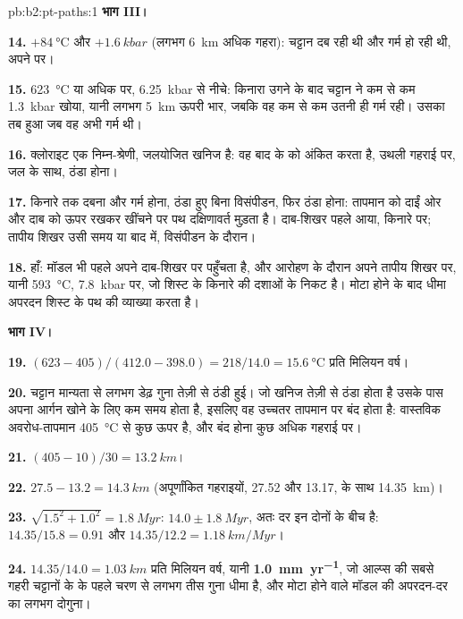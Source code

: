 \begin{solution}{pb:b2:pt-paths:1}
\noindent\textbf{भाग III।}

\textbf{14.} $+\qty{84}{\celsius}$ और $+\qty{1.6}{kbar}$ (लगभग \qty{6}{km} अधिक गहरा):
चट्टान दब रही थी और गर्म हो रही थी, अपने  पर।

\textbf{15.} \qty{623}{\celsius} या अधिक पर, \qty{6.25}{kbar} से नीचे: किनारा उगने के बाद
चट्टान ने कम से कम \qty{1.3}{kbar} खोया, यानी लगभग \qty{5}{km} ऊपरी भार, जबकि वह कम से कम
उतनी ही गर्म रही। उसका  तब हुआ जब वह अभी गर्म थी।

\textbf{16.} क्लोराइट एक निम्न-श्रेणी, जलयोजित खनिज है: वह बाद के  को अंकित करता है, उथली गहराई पर, जल के साथ, ठंडा होना।

\textbf{17.} किनारे तक दबना और गर्म होना, ठंडा हुए बिना विसंपीडन, फिर ठंडा होना:
तापमान को दाईं ओर और दाब को ऊपर रखकर खींचने पर पथ दक्षिणावर्त मुड़ता है।
दाब-शिखर पहले आया, किनारे पर; तापीय शिखर उसी समय या बाद में, विसंपीडन के
दौरान।

\textbf{18.} हाँ: मॉडल भी पहले अपने दाब-शिखर पर पहुँचता है, और आरोहण के दौरान अपने तापीय शिखर पर,
यानी \qty{593}{\celsius}, \qty{7.8}{kbar} पर, जो शिस्ट के किनारे की
दशाओं के निकट है। मोटा होने के बाद धीमा अपरदन शिस्ट के पथ की व्याख्या करता है।

\noindent\textbf{भाग IV।}

\textbf{19.} $(623 - 405)/(412.0 - 398.0) = 218/14.0 = \qty{15.6}{\celsius}$ प्रति मिलियन
वर्ष।

\textbf{20.} चट्टान मान्यता से लगभग डेढ़ गुना तेज़ी से ठंडी हुई। जो खनिज
तेज़ी से ठंडा होता है उसके पास अपना आर्गन खोने के लिए कम समय होता है, इसलिए वह उच्चतर तापमान पर बंद होता है:
वास्तविक अवरोध-तापमान \qty{405}{\celsius} से कुछ ऊपर है, और बंद होना
कुछ अधिक गहराई पर।

\textbf{21.} $(405 - 10)/30 = \qty{13.2}{km}$।

\textbf{22.} $27.5 - 13.2 = \qty{14.3}{km}$ (अपूर्णांकित गहराइयों, 27.52 और 13.17, के साथ
\qty{14.35}{km})।

\textbf{23.} $\sqrt{1.5^2 + 1.0^2} = \qty{1.8}{Myr}$: $14.0 \pm \qty{1.8}{Myr}$, अतः दर इन दोनों के बीच है:
$14.35/15.8 = 0.91$ और $14.35/12.2 = \qty{1.18}{km/Myr}$।

\textbf{24.} $14.35/14.0 = \qty{1.03}{km}$ प्रति मिलियन वर्ष, यानी
\textbf{\qty[text-series-to-math=true]{1.0}{mm.yr^{-1}}}, जो आल्प्स की सबसे गहरी चट्टानों के  के
पहले चरण से लगभग तीस गुना धीमा है, और मोटा होने वाले मॉडल की अपरदन-दर का
लगभग दोगुना।
\end{solution}
